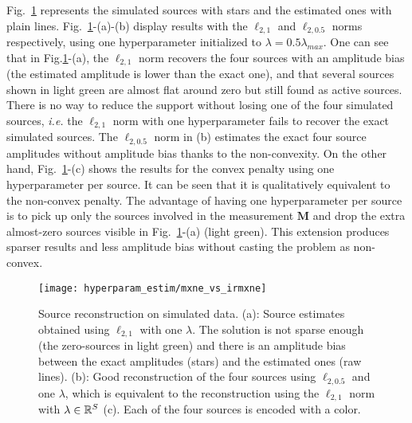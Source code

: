 Fig.~\ref{fig:mxne_vs_irmxne} represents the simulated sources with stars and the estimated ones with plain lines.
Fig.~\ref{fig:mxne_vs_irmxne}-(a)-(b) display results with the $\ell_{2,1}$ and $\ell_{2,0.5}$ norms respectively, using one hyperparameter initialized to $\lambda=0.5\lambda_{max}$. One can see that in Fig.\ref{fig:mxne_vs_irmxne}-(a), the $\ell_{2,1}$ norm recovers the four sources with an amplitude bias (the estimated amplitude is lower than the exact one), and that several sources shown in light green are almost flat around zero but still found as active sources. There is no way to reduce the support without losing one of the four simulated sources,  \textit{i.e.} the $\ell_{2,1}$ norm with one hyperparameter fails to recover the exact simulated sources.
The $\ell_{2,0.5}$ norm in (b) estimates the exact four source amplitudes without amplitude bias thanks to the non-convexity\cite{irMxNE}. On the other hand, Fig.~\ref{fig:mxne_vs_irmxne}-(c) shows the results for the convex penalty using one hyperparameter per source. It can be seen that it is qualitatively equivalent to the non-convex penalty. 
The advantage of having one hyperparameter per source is to pick up only the sources involved in the measurement $\mathbf{M}$ and drop the extra almost-zero sources visible in Fig.~\ref{fig:mxne_vs_irmxne}-(a) (light green). This extension produces sparser results and less amplitude bias without casting the problem as non-convex. %

\begin{figure}
	\texttt{[image: hyperparam\_estim/mxne\_vs\_irmxne]}
    \caption{Source reconstruction on simulated data. (a): Source estimates obtained using $\ell_{2,1}$ with one $\lambda$. The solution is not sparse enough (the zero-sources in light green) and there is an amplitude bias between the exact amplitudes (stars) and the estimated ones (raw lines). (b): Good reconstruction of the four sources using $\ell_{2,0.5}$ and one $\lambda$, which is equivalent to the reconstruction using the $\ell_{2,1}$ norm with $\lambda\in\mathbb{R}^S$ (c). Each of the four sources is encoded with a color.
    }
    \label{fig:mxne_vs_irmxne}
\end{figure}

